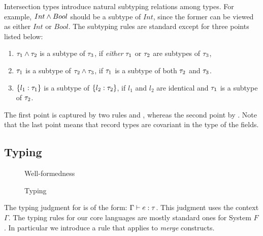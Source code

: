 Intersection types introduce natural subtyping relations among types. For
example, $ Int \wedge Bool $ should be a subtype of $ Int $, since the
former can be viewed as either $ Int $ or $ Bool $. The subtyping rules are
standard except for three points listed below:
\begin{enumerate}
\item $ \tau_1 \wedge \tau_2 $ is a subtype of $ \tau_3 $, if \emph{either} $ \tau_1 $ or
  $ \tau_2 $ are subtypes of $ \tau_3 $,

\item $ \tau_1 $ is a subtype of $ \tau_2 \wedge \tau_3 $, if $ \tau_1 $ is a subtype of
  both $ \tau_2 $ and $ \tau_3 $.

\item $ \{ l_1 : \tau_1 \} $ is a subtype of $ \{ l_2 : \tau_2 \} $, if
  $ l_1 $ and $ l_2 $ are identical and $ \tau_1 $ is a subtype of $ \tau_2 $.
\end{enumerate}
The first point is captured by two rules  and ,
whereas the second point by . Note that the last point means
that record types are covariant in the type of the fields.

\subsection{Typing}

\begin{figure}

\caption{Well-formedness}
\end{figure}

\begin{figure}



\caption{Typing}
\end{figure}

The typing judgment for \name is of the form: $ \Gamma \vdash e : \tau $. This
judgment uses the context $ \Gamma $. The typing rules for our core languages
are mostly standard ones for System $ F $. In particular we introduce a
 rule that applies to \emph{merge} constructs.

